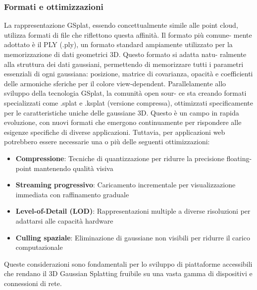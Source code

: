 \subsubsection{Formati e ottimizzazioni}
La rappresentazione GSplat, essendo concettualmente simile alle point cloud,
utilizza formati di file che riflettono questa affinità. Il formato più comune-
mente adottato è il PLY (.ply), un formato standard ampiamente utilizzato
per la memorizzazione di dati geometrici 3D. Questo formato si adatta natu-
ralmente alla struttura dei dati gaussiani, permettendo di memorizzare tutti
i parametri essenziali di ogni gaussiana: posizione, matrice di covarianza,
opacità e coefficienti delle armoniche sferiche per il colore view-dependent.
Parallelamente allo sviluppo della tecnologia GSplat, la comunità open sour-
ce sta creando formati specializzati come .splat e .ksplat (versione compressa), ottimizzati specificamente per le caratteristiche uniche delle gaussiane 3D. Questo è un campo in rapida evoluzione, con nuovi formati che
emergono continuamente per rispondere alle esigenze specifiche di diverse
applicazioni.
Tuttavia, per applicazioni web potrebbero essere necessarie una o più delle seguenti ottimizzazioni:

\begin{itemize}
    \item \textbf{Compressione}: Tecniche di quantizzazione per ridurre la precisione floating-point mantenendo qualità visiva
    \item \textbf{Streaming progressivo}: Caricamento incrementale per visualizzazione immediata con raffinamento graduale
    \item \textbf{Level-of-Detail (LOD)}: Rappresentazioni multiple a diverse risoluzioni per adattarsi alle capacità hardware
    \item \textbf{Culling spaziale}: Eliminazione di gaussiane non visibili per ridurre il carico computazionale
\end{itemize}

Queste considerazioni sono fondamentali per lo sviluppo di piattaforme accessibili che rendano il 3D Gaussian Splatting fruibile su una vasta gamma di dispositivi e connessioni di rete.
